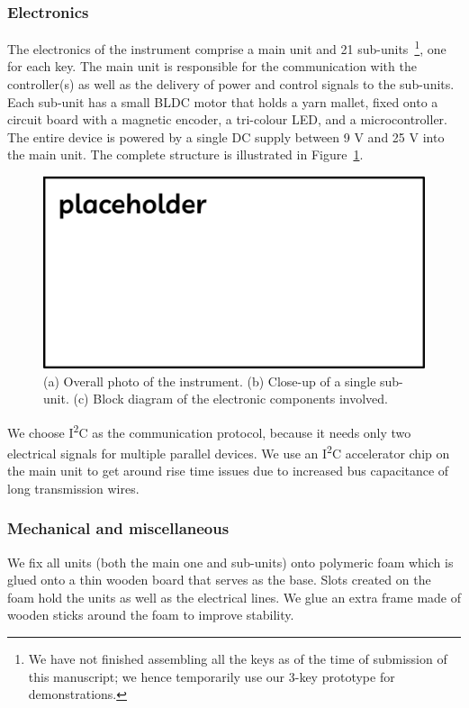 \documentclass{nime-alternate} %
\begin{document}
\subsubsection{Electronics}
The electronics of the instrument comprise a main unit and 21 sub-units~\footnote{We have not finished assembling all the keys as of the time of submission of this manuscript; we hence temporarily use our 3-key prototype for demonstrations.}, one for each key. The main unit is responsible for the communication with the controller(s) as well as the delivery of power and control signals to the sub-units. Each sub-unit has a small BLDC motor that holds a yarn mallet, fixed onto a circuit board with a magnetic encoder, a tri-colour LED, and a microcontroller. The entire device is powered by a single DC supply between 9 V and 25 V into the main unit. The complete structure is illustrated in Figure~\ref{fig:MalletConstruction}.

\begin{figure}[h!]
  \centering
  \includegraphics[width=1\textwidth]{placeholder.png}
  \caption{(a) Overall photo of the instrument. (b) Close-up of a single sub-unit. (c) Block diagram of the electronic components involved.}
  \label{fig:MalletConstruction}
\end{figure}

We choose I\textsuperscript{2}C as the communication protocol, because it needs only two electrical signals for multiple parallel devices. We use an I\textsuperscript{2}C accelerator chip on the main unit to get around rise time issues due to increased bus capacitance of long transmission wires.

\subsubsection{Mechanical and miscellaneous}
We fix all units (both the main one and sub-units) onto polymeric foam which is glued onto a thin wooden board that serves as the base. Slots created on the foam hold the units as well as the electrical lines. We glue an extra frame made of wooden sticks around the foam to improve stability.
\end{document}
